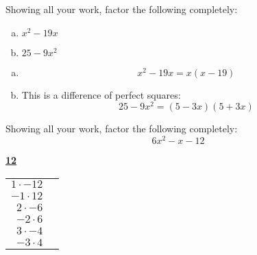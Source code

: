 \documentclass[11pt,letterpaper]{article}
\begin{document}
\newpage



  Showing all your work, factor the following completely:
	\begin{enumerate}[(a)]
	\item $x^2 - 19x$
	\item $25 - 9x^2$
	\end{enumerate} \pspace

\sol
\begin{enumerate}[(a)]
\item 
	\[
	x^2 - 19x= x(x - 19)
	\] \pspace

\item This is a difference of perfect squares:
	\[
	25 - 9x^2= (5 - 3x)(5 + 3x)
	\]
\end{enumerate}



\newpage



 Showing all your work, factor the following completely:
	\[
	6x^2 - x - 12
	\] \pspace

\sol
	\begin{table}[!ht]
	\centering
	\underline{\bfseries 12} \pvspace{0.2cm}
	\begin{tabular}{rr}
	$1 \cdot -12$ \\
	$-1 \cdot 12$ \\
	$2 \cdot -6$ \\
	$-2 \cdot 6$ \\
	$3 \cdot -4$ \\
	$-3 \cdot 4$
	\end{tabular}
	\end{table}
\end{document}

